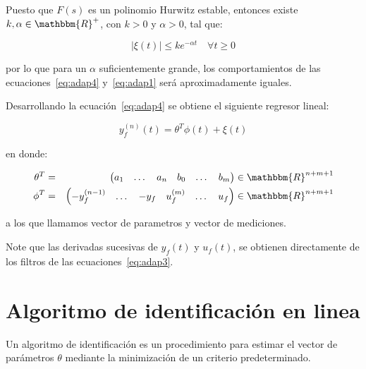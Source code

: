         Puesto que $F(s)$ es un polinomio Hurwitz estable, entonces existe $k, \alpha \in \mathbbm{R}^+$, con $k > 0$ y $\alpha > 0$, tal que:

        \begin{equation*}
            |\xi(t)| \le k e^{- \alpha t} \quad \forall t \ge 0
        \end{equation*}

        por lo que para un $\alpha$ suficientemente grande, los comportamientos de las ecuaciones~\ref{eq:adap4} y~\ref{eq:adap1} será aproximadamente iguales.

        Desarrollando la ecuación~\ref{eq:adap4} se obtiene el siguiente regresor lineal:

        \begin{equation}
            y_f^{(n)}(t) = \theta^T \phi(t) + \xi(t)
        \end{equation}

        en donde:

        \begin{eqnarray} \label{eq:adap5}
            \theta^T & = & \begin{pmatrix} a_1 & \dots & a_n & b_0 & \dots & b_m \end{pmatrix} \in \mathbbm{R}^{n+m+1} \nonumber \\
            \phi^T & = & \begin{pmatrix} -y_f^{(n-1)} & \dots & -y_f & u_f^{(m)} & \dots & u_f \end{pmatrix} \in \mathbbm{R}^{n+m+1}
        \end{eqnarray}

        a los que llamamos vector de parametros y vector de mediciones.

        Note que las derivadas sucesivas de $y_f(t)$ y $u_f(t)$, se obtienen directamente de los filtros de las ecuaciones~\ref{eq:adap3}.



    \newpage
    \section{Algoritmo de identificación en linea}

        Un algoritmo de identificación es un procedimiento para estimar el vector de parámetros $\theta$ mediante la minimización de un criterio predeterminado.

